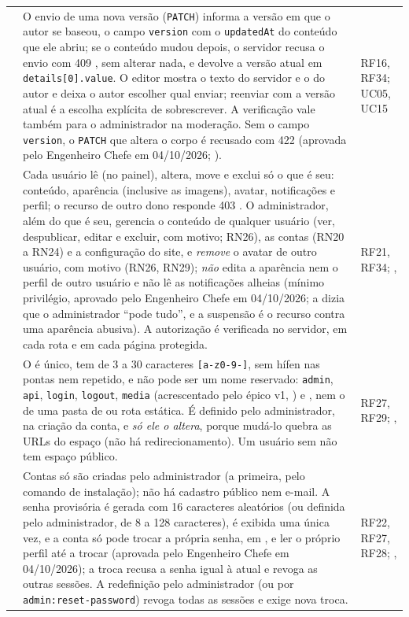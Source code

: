 \begin{longtable}{@{}L{1.3cm}L{9.6cm}L{2.8cm}@{}}
 & O envio de uma nova versão (\texttt{PATCH}) informa a versão em que o autor se baseou, o campo \texttt{version} com o \texttt{updatedAt} do conteúdo que ele abriu; se o conteúdo mudou depois, o servidor recusa o envio com 409 , sem alterar nada, e devolve a versão atual em \texttt{details[0].value}. O editor mostra o texto do servidor e o do autor e deixa o autor escolher qual enviar; reenviar com a versão atual é a escolha explícita de sobrescrever. A verificação vale também para o administrador na moderação. Sem o campo \texttt{version}, o \texttt{PATCH} que altera o corpo é recusado com 422 (aprovada pelo Engenheiro Chefe em 04/10/2026; ). & RF16, RF34; UC05, UC15\\[1pt]
 & Cada usuário lê (no painel), altera, move e exclui só o que é seu: conteúdo, aparência (inclusive as imagens), avatar, notificações e perfil; o recurso de outro dono responde 403 . O administrador, além do que é seu, gerencia o conteúdo de qualquer usuário (ver, despublicar, editar e excluir, com motivo; RN26), as contas (RN20 a RN24) e a configuração do site, e \emph{remove} o avatar de outro usuário, com motivo (RN26, RN29); \emph{não} edita a aparência nem o perfil de outro usuário e não lê as notificações alheias (mínimo privilégio, aprovado pelo Engenheiro Chefe em 04/10/2026; a  dizia que o administrador ``pode tudo'', e a suspensão é o recurso contra uma aparência abusiva). A autorização é verificada no servidor, em cada rota e em cada página protegida. & RF21, RF34; , \\[1pt]
 & O  é único, tem de 3 a 30 caracteres \texttt{[a-z0-9-]}, sem hífen nas pontas nem repetido, e não pode ser um nome reservado: \texttt{admin}, \texttt{api}, \texttt{login}, \texttt{logout}, \texttt{media} (acrescentado pelo épico v1, ) e , nem o de uma pasta de  ou rota estática. É definido pelo administrador, na criação da conta, e \emph{só ele o altera}, porque mudá-lo quebra as URLs do espaço (não há redirecionamento). Um usuário sem  não tem espaço público. & RF27, RF29; , \\[1pt]
 & Contas só são criadas pelo administrador (a primeira, pelo comando de instalação); não há cadastro público nem e-mail. A senha provisória é gerada com 16 caracteres aleatórios (ou definida pelo administrador, de 8 a 128 caracteres), é exibida uma única vez, e a conta só pode trocar a própria senha, em , e ler o próprio perfil até a trocar (aprovada pelo Engenheiro Chefe em 04/10/2026); a troca recusa a senha igual à atual e revoga as outras sessões. A redefinição pelo administrador (ou por \texttt{admin:reset-password}) revoga todas as sessões e exige nova troca. & RF22, RF27, RF28; , \\[1pt]

\end{longtable}
